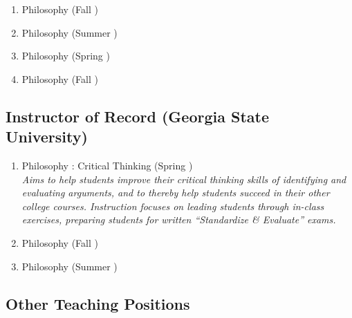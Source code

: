 \documentclass{rhelder3cv}
\begin{document}
\begin{enumerate}
    (Spring )\\
    \emph{%
      \small
      A concentrated study of Aristotle’s philosophy,
      including logic, theory of explanation, natural philosophy, psychology,
      metaphysics, and ethics.
      Students learn how to read Aristotle’s dense prose
      and form their own judgments
      about controversial matters of interpretation.
      Students meet with the Graduate Student Instructor every week
      in small discussion sections.%
    }
  \item Philosophy 
    (Fall )
  \item Philosophy 
    (Summer )
  \item Philosophy 
    (Spring )
  \item Philosophy 
    (Fall )
\end{enumerate}

\subsection{%
  Instructor of Record
  \textnormal{(}Georgia State University\textnormal{)}%
}

\begin{enumerate}
  \item Philosophy : Critical Thinking
    (Spring )\\
    \emph{%
      \small
      Aims to help students improve their critical thinking skills
      of identifying and evaluating arguments,
      and to thereby help students succeed in their other college courses.
      Instruction focuses on leading students through in-class exercises,
      preparing students for written \enquote{Standardize \& Evaluate} exams.%
    }
  \item Philosophy 
    (Fall )
  \item Philosophy 
    (Summer )
\end{enumerate}

\subsection{Other Teaching Positions}
\end{document}
